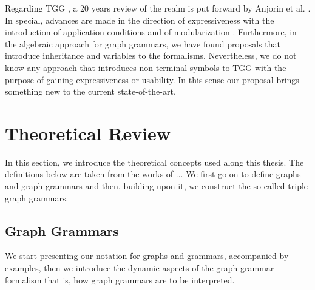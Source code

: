 \documentclass[]{report}
\begin{document}
Regarding TGG \cite{schurr1994specification}, a 20 years review of the realm is put forward by Anjorin et al. \cite{anjorin201620}. In special, advances are made in the direction of expressiveness with the introduction of application conditions \cite{klar2010extended} and of modularization \cite{anjorin2014modularizing}. Furthermore, in the algebraic approach for graph grammars, we have found proposals that introduce inheritance \cite{bardohl2004integrating,hermann2008typed} and variables \cite{hoffmann2005graph} to the formalisms. Nevertheless, we do not know any approach that introduces non-terminal symbols to TGG with the purpose of gaining expressiveness or usability. In this sense our proposal brings something new to the current state-of-the-art.


\section{Theoretical Review}
In this section, we introduce the theoretical concepts used along this thesis. The definitions below are taken from the works of ...%
We first go on to define graphs and graph grammars and then, building upon it, we construct the so-called triple graph grammars.


\subsection{Graph Grammars}
We start presenting our notation for graphs and grammars, accompanied by examples, then we introduce the dynamic aspects of the graph grammar formalism that is, how graph grammars are to be interpreted.

\end{document}
